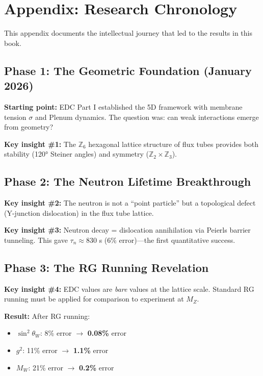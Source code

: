 \documentclass[11pt,a4paper]{book}
\theoremstyle{definition}
\theoremstyle{remark}
\begin{document}
\chapter*{Appendix: Research Chronology}

This appendix documents the intellectual journey that led to the results in this book.

\section*{Phase 1: The Geometric Foundation (January 2026)}

\textbf{Starting point:} EDC Part I established the 5D framework with membrane tension
$\sigma$ and Plenum dynamics. The question was: can weak interactions emerge from geometry?

\textbf{Key insight \#1:} The $\mathbb{Z}_6$ hexagonal lattice structure of flux tubes
provides both stability (120° Steiner angles) and symmetry ($\mathbb{Z}_2 \times \mathbb{Z}_3$).

\section*{Phase 2: The Neutron Lifetime Breakthrough}

\textbf{Key insight \#2:} The neutron is not a ``point particle'' but a topological
defect (Y-junction dislocation) in the flux tube lattice.

\textbf{Key insight \#3:} Neutron decay = dislocation annihilation via Peierls barrier
tunneling. This gave $\tau_n \approx 830$ s (6\% error)---the first quantitative success.

\section*{Phase 3: The RG Running Revelation}

\textbf{Key insight \#4:} EDC values are \emph{bare} values at the lattice scale.
Standard RG running must be applied for comparison to experiment at $M_Z$.

\textbf{Result:} After RG running:
\begin{itemize}
  \item $\sin^2\theta_W$: 8\% error $\to$ \textbf{0.08\%} error
  \item $g^2$: 11\% error $\to$ \textbf{1.1\%} error
  \item $M_W$: 21\% error $\to$ \textbf{0.2\%} error
\end{itemize}
\end{document}
